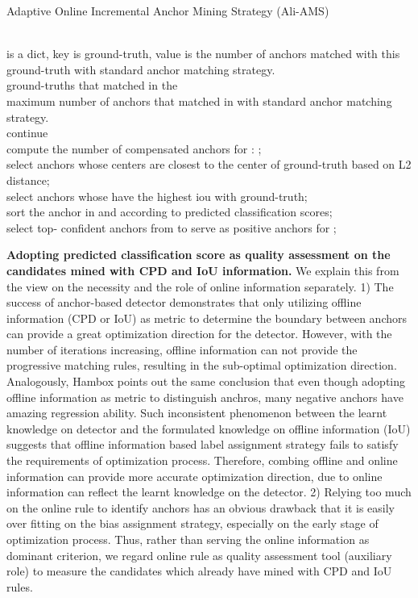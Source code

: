 \documentclass[10pt,twocolumn,letterpaper]{article}
\begin{document}
\begin{algorithm}[t!]
\small
\caption{Adaptive Online Incremental Anchor Mining Strategy (Ali-AMS)} 
\label{alg:ali_ams} 
\begin{algorithmic}[1]
\REQUIRE ~~\\
 is a dict, key is ground-truth, value is the number of anchors matched with this ground-truth with standard anchor matching strategy. \\
\vspace{2mm}
\STATE  ground-truths that matched in the  \\
\STATE  maximum number of anchors that matched in  with standard anchor matching strategy. \\
\IF{}
\STATE continue
\ENDIF \\
\STATE compute the number of compensated anchors for : ;  \\
\STATE  select  anchors whose centers are closest to the center of ground-truth  based on L2 distance; \\
\STATE  select  anchors whose have the highest iou with ground-truth; \\
\STATE  sort the anchor in  and  according to predicted classification scores; \\
\STATE  select top- confident anchors from  to serve as positive anchors for ; \\ 
\ENDFOR
\ENDFOR 

\end{algorithmic}
\end{algorithm}
\noindent\textbf{Adopting predicted classification score as quality assessment on the candidates mined with CPD and IoU information.} 
We explain this from the view on the necessity and the role of online information separately.
1) The success of anchor-based detector demonstrates that only utilizing offline information (CPD or IoU) as metric to determine the boundary between  anchors can provide a great optimization direction for the detector. However, with the number of iterations increasing, offline information  can not provide the progressive matching rules, resulting in the sub-optimal optimization direction.
Analogously, Hambox \cite{liu2019hambox} points out the same conclusion that even though adopting offline information as metric to distinguish  anchros, many negative anchors have amazing regression ability. Such inconsistent phenomenon between the learnt knowledge on detector and the formulated knowledge on offline information (IoU) suggests that offline information based label assignment strategy fails to satisfy the requirements of optimization process. Therefore, combing offline and online information can provide more accurate optimization direction, due to online information can reflect the learnt knowledge on the detector. 
2) Relying too much on  the online rule to identify  anchors  has an obvious drawback that it is easily over fitting on the bias assignment strategy, especially on the early stage of optimization process. Thus, rather than serving the online information as dominant criterion, we regard online rule as quality assessment tool (auxiliary role) to measure the candidates which already have mined with CPD and IoU rules. 
\end{document}
